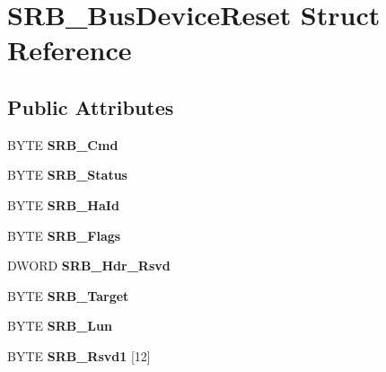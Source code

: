 \hypertarget{structSRB__BusDeviceReset}{\section{S\-R\-B\-\_\-\-Bus\-Device\-Reset Struct Reference}
\label{structSRB__BusDeviceReset}
}
\subsection*{Public Attributes}
\begin{DoxyCompactItemize}
\item 
\hypertarget{structSRB__BusDeviceReset_adfe86b5752c8291ac2df07d0566730ac}{B\-Y\-T\-E {\bfseries S\-R\-B\-\_\-\-Cmd}}\label{structSRB__BusDeviceReset_adfe86b5752c8291ac2df07d0566730ac}

\item 
\hypertarget{structSRB__BusDeviceReset_ad4469f1f497caf6276645f27bb386ada}{B\-Y\-T\-E {\bfseries S\-R\-B\-\_\-\-Status}}\label{structSRB__BusDeviceReset_ad4469f1f497caf6276645f27bb386ada}

\item 
\hypertarget{structSRB__BusDeviceReset_a139b678421b5f50e82e1fc43e349f3c3}{B\-Y\-T\-E {\bfseries S\-R\-B\-\_\-\-Ha\-Id}}\label{structSRB__BusDeviceReset_a139b678421b5f50e82e1fc43e349f3c3}

\item 
\hypertarget{structSRB__BusDeviceReset_a500656c217006ae403bc0235f4a32567}{B\-Y\-T\-E {\bfseries S\-R\-B\-\_\-\-Flags}}\label{structSRB__BusDeviceReset_a500656c217006ae403bc0235f4a32567}

\item 
\hypertarget{structSRB__BusDeviceReset_a0ce7c88515e5aa1f81dbf49ce59bbdef}{D\-W\-O\-R\-D {\bfseries S\-R\-B\-\_\-\-Hdr\-\_\-\-Rsvd}}\label{structSRB__BusDeviceReset_a0ce7c88515e5aa1f81dbf49ce59bbdef}

\item 
\hypertarget{structSRB__BusDeviceReset_a0683f39322a0b450993d0a1ae535f494}{B\-Y\-T\-E {\bfseries S\-R\-B\-\_\-\-Target}}\label{structSRB__BusDeviceReset_a0683f39322a0b450993d0a1ae535f494}

\item 
\hypertarget{structSRB__BusDeviceReset_a95f98f988bac208fefdccbd910931895}{B\-Y\-T\-E {\bfseries S\-R\-B\-\_\-\-Lun}}\label{structSRB__BusDeviceReset_a95f98f988bac208fefdccbd910931895}

\item 
\hypertarget{structSRB__BusDeviceReset_a0a96f54924e32dca9d2838251f88a504}{B\-Y\-T\-E {\bfseries S\-R\-B\-\_\-\-Rsvd1} \mbox{[}12\mbox{]}}\label{structSRB__BusDeviceReset_a0a96f54924e32dca9d2838251f88a504}


\end{DoxyCompactItemize}
